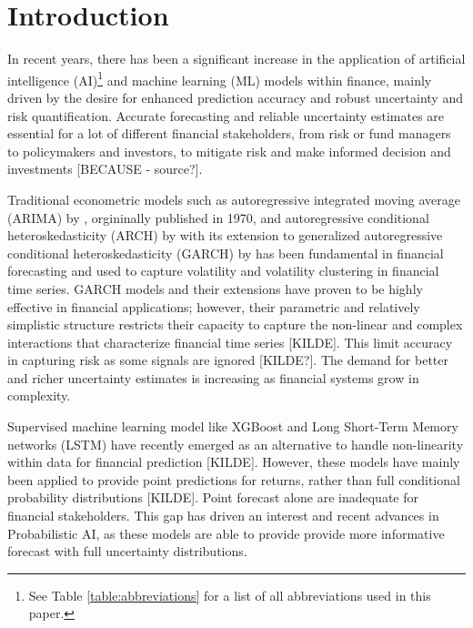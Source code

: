 \section{Introduction}
\label{sec:introduction}

In recent years, there has been a significant increase in the application of artificial intelligence (AI)\footnote{See Table \ref{table:abbreviations} for a list of all abbreviations used in this paper.
} and machine learning (ML) models within finance, mainly driven by the desire for enhanced prediction accuracy and robust uncertainty and risk quantification. Accurate forecasting and reliable uncertainty estimates are essential for a lot of different financial stakeholders, from risk or fund managers to policymakers and investors, to mitigate risk and make informed decision and investments [BECAUSE - source?]. 

Traditional econometric models such as autoregressive integrated moving average (ARIMA) by \textcite{boxJenkins2016time}, orgininally published in 1970, and autoregressive conditional heteroskedasticity (ARCH) by \textcite{Engle1982ARCH} with its extension to generalized autoregressive conditional heteroskedasticity (GARCH) by \textcite{BOLLERSLEV1986GARCH} has been fundamental in financial forecasting and used to capture volatility and volatility clustering in financial time series. GARCH models and their extensions have proven to be highly effective in financial applications; however, their parametric and relatively simplistic structure restricts their capacity to capture the non-linear and complex interactions that characterize financial time series [KILDE]. This limit accuracy in capturing risk as some signals are ignored [KILDE?]. The demand for better and richer uncertainty estimates is increasing as financial systems grow in complexity.

Supervised machine learning model like XGBoost and Long Short-Term Memory networks (LSTM) have recently emerged as an alternative to handle non-linearity within data for financial prediction [KILDE]. However, these models have mainly been applied to provide point predictions for returns, rather than full conditional probability distributions [KILDE]. Point forecast alone are inadequate for financial stakeholders. This gap has driven an interest and recent advances in Probabilistic AI, as these models are able to provide provide more informative forecast with full uncertainty distributions.


